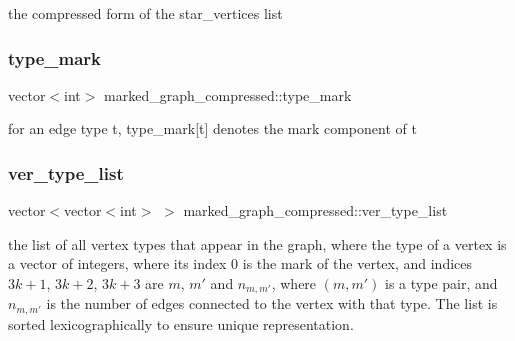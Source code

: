 the compressed form of the star\+\_\+vertices list 

\mbox{\label{classmarked__graph__compressed_a86b00223525703e973415cbc9c94da68}} 
\subsubsection{\texorpdfstring{type\+\_\+mark}{type\_mark}}
{\footnotesize\ttfamily vector$<$int$>$ marked\+\_\+graph\+\_\+compressed\+::type\+\_\+mark}



for an edge type t, type\+\_\+mark\mbox{[}t\mbox{]} denotes the mark component of t 

\mbox{\label{classmarked__graph__compressed_af2e3e55223d436628a02758dfae88493}} 
\subsubsection{\texorpdfstring{ver\+\_\+type\+\_\+list}{ver\_type\_list}}
{\footnotesize\ttfamily vector$<$vector$<$int$>$ $>$ marked\+\_\+graph\+\_\+compressed\+::ver\+\_\+type\+\_\+list}



the list of all vertex types that appear in the graph, where the type of a vertex is a vector of integers, where its index 0 is the mark of the vertex, and indices $3k+1$, $3k+2$, $3k+3$ are $m$, $m'$ and $n_{m,m'}$, where $(m,m')$ is a type pair, and $n_{m,m'}$ is the number of edges connected to the vertex with that type. The list is sorted lexicographically to ensure unique representation. 

\mbox{\label{classmarked__graph__compressed_af446cc5e23c241a92b76642fd5ebc403}} 
